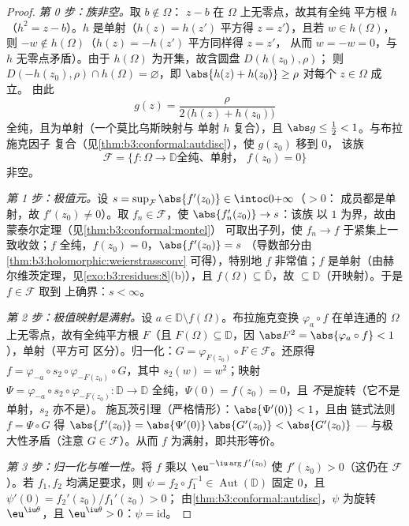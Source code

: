 \begin{proof}
\emph{第 0 步：族非空。}取 $b \notin \Omega$：
$z - b$ 在 $\Omega$ 上无零点，故其有全纯
平方根 $h$（$h^2 = z - b$）。$h$ 是单射（$h(z) =
h(z')$ 平方得 $z = z'$），且若 $w \in h(\Omega)$，则 $-w
\notin h(\Omega)$（$h(z) = -h(z')$ 平方同样得 $z = z'$，
从而 $w = -w = 0$，与 $h$ 无零点矛盾）。由于
$h(\Omega)$ 为开集，故含圆盘 $D(h(z_0), \rho)$；
则 $D(-h(z_0), \rho) \cap h(\Omega) = \varnothing$，即
$\abs{h(z) + h(z_0)} \geq \rho$ 对每个 $z \in \Omega$ 成立。
由此
\[
g(z) = \frac{\rho}{2\,\bigl(h(z) + h(z_0)\bigr)}
\]
全纯，且为单射（一个莫比乌斯映射与
单射 $h$ 复合），且 $\abs g \leq \frac12 < 1$。与布拉施克因子
复合（见\cref{thm:b3:conformal:autdisc}），使 $g(z_0)$ 移到 $0$，
该族
\[
\mathcal F = \{f \colon \Omega \to \mathbb D \text{
全纯、单射， } f(z_0) = 0\}
\]
非空。

\emph{第 1 步：极值元。}设 $s =
\sup_{\mathcal F}\abs{f'(z_0)} \in \intoc0{+\infty}$（$> 0$：
成员都是单射，故 $f'(z_0) \neq 0$）。取 $f_n \in
\mathcal F$，使 $\abs{f_n'(z_0)} \to s$：该族
以 $1$ 为界，故由蒙泰尔定理（见\cref{thm:b3:conformal:montel}）
可取出子列，使 $f_n \to f$ 于紧集上一致收敛；$f$
全纯，$f(z_0) = 0$，$\abs{f'(z_0)} = s$
（导数部分由\cref{thm:b3:holomorphic:weierstrassconv}
可得），特别地 $f$ 非常值；$f$
是单射（由赫尔维茨定理，见\cref{exo:b3:residues:8}(b)），且
$f(\Omega) \subseteq \bar{\mathbb D}$，故 $\subseteq
\mathbb D$（开映射）。于是 $f \in \mathcal F$ 取到
上确界：$s < \infty$。

\emph{第 2 步：极值映射是满射。}设 $a \in
\mathbb D\setminus f(\Omega)$。布拉施克变换
$\varphi_a\circ f$ 在单连通的
$\Omega$ 上无零点，故有全纯平方根 $F$（且
$F(\Omega) \subseteq \mathbb D$，因 $\abs F^2 =
\abs{\varphi_a\circ f} < 1$），单射（平方可
区分）。归一化：$G = \varphi_{F(z_0)}\circ F \in
\mathcal F$。还原得 $f = \varphi_{-a}\circ s_2 \circ
\varphi_{-F(z_0)}\circ G$，其中 $s_2(w) = w^2$；映射 $\Psi
= \varphi_{-a}\circ s_2\circ\varphi_{-F(z_0)} \colon \mathbb D
\to \mathbb D$ 全纯，$\Psi(0) = f(z_0) = 0$，且
\emph{不}是旋转（它不是单射，$s_2$ 亦不是）。
施瓦茨引理（严格情形）：$\abs{\Psi'(0)} < 1$，且由
链式法则 $f = \Psi\circ G$ 得 $\abs{f'(z_0)} =
\abs{\Psi'(0)}\,\abs{G'(z_0)} < \abs{G'(z_0)}$ ---
与极大性矛盾（注意 $G \in \mathcal F$）。从而 $f$
为满射，即共形等价。

\emph{第 3 步：归一化与唯一性。}将 $f$ 乘以
$\eu^{-\iu\arg f'(z_0)}$ 使 $f'(z_0) > 0$（这仍在
$\mathcal F$）。若 $f_1, f_2$ 均满足要求，则 $\psi =
f_2\circ f_1^{-1} \in \operatorname{Aut}(\mathbb D)$ 固定
$0$，且 $\psi'(0) = f_2'(z_0)/f_1'(z_0) > 0$；
由\cref{thm:b3:conformal:autdisc}，$\psi$ 为旋转
$\eu^{\iu\theta}$，且 $\eu^{\iu\theta} > 0$：$\psi =
\mathrm{id}$。
\end{proof}

